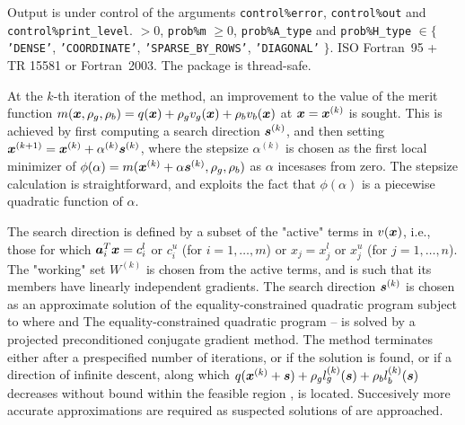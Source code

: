 \documentclass{galahad}
\begin{document}
\galio Output is under control of the arguments
 {\tt control\%error}, {\tt control\%out} and {\tt control\%print\_level}.
 $> 0$, {\tt prob\%m} $\geq  0$, 
{\tt prob\%A\_type} and {\tt prob\%H\_type} $\in \{${\tt 'DENSE'}, 
 {\tt 'COORDINATE'}, {\tt 'SPARSE\_BY\_ROWS'}, {\tt 'DIAGONAL'} $\}$. 
\galportability ISO Fortran~95 + TR 15581 or Fortran~2003. 
The package is thread-safe.


\galmethod
At the $k$-th iteration of the method, an improvement to the value
of the merit function 
$m({\bm{x}}, \rho_g, \rho_b ) = q({\bm{x}}) + \rho_g v_g({\bm{x}}) + \rho_b v_b({\bm{x}})$
at ${\bm{x}} = {\bm{x}}^{(k)}$ is sought. This is achieved by first 
computing a search direction ${\bm{s}}^{(k)}$,
and then setting ${\bm{x}}^{(k+1)} = {\bm{x}}^{(k)} + \alpha^{(k)} {\bm{s}}^{(k)}$,
where the stepsize $\alpha^{(k)}$ is chosen as the first local minimizer of 
$\phi ( \alpha ) = m( {\bm{x}}^{(k)} + \alpha {\bm{s}}^{(k)} , \rho_g, \rho_b )$
as $\alpha$ incesases from zero. 
The stepsize calculation is straightforward, and exploits the fact that
$\phi ( \alpha )$ is a piecewise quadratic function of $\alpha$.

The search direction is defined by a subset of the "active" terms in 
$v({\bm{x}})$, i.e., those for which 
${\bm{a}}_i^T {\bm{x}} = c_i^l$ or $c_i^u$ (for $i=1,\ldots ,m$) or 
$x_j = x_j^l$ or $x_j^u$ (for $j=1,\ldots ,n$).
The "working" set $W^{(k)}$ is chosen from the active terms, and is such 
that its members have linearly independent gradients. 
The search direction ${\bm{s}}^{(k)}$ is chosen as an approximate solution of 
the equality-constrained quadratic program
subject to 
where
and
The equality-constrained quadratic program -- is solved by
a projected preconditioned conjugate gradient method. The method terminates
either after a prespecified number of iterations, or if the solution is found,
or if a direction of infinite descent, along which 
$q({\bm{x}}^{(k)} + {\bm{s}}) + \rho_g l_g^{(k)} ({\bm{s}}) + \rho_b l_b^{(k)} ({\bm{s}})$
decreases without bound within the feasible region , is located. 
Succesively more accurate approximations are required as suspected 
solutions of  are approached.
\end{document}
